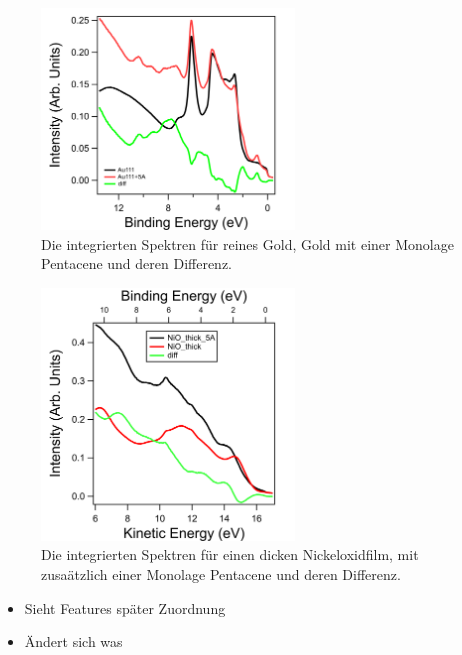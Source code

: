         \begin{figure}
            \centering
            \includegraphics[width=0.6\textwidth]{./content/EDC_Au_5A.png}
            \caption{Die integrierten Spektren für reines Gold, Gold mit einer Monolage Pentacene und deren Differenz.}
            \label{fig:Au+5A}
        \end{figure}

        \begin{figure}
            \centering
            \includegraphics[width=0.6\textwidth]{./content/NiO_thick_5A.png}
            \caption{Die integrierten Spektren für einen dicken Nickeloxidfilm, mit zusaätzlich einer Monolage Pentacene und deren Differenz.}
            \label{fig:NiO+5A}
        \end{figure}

        \begin{itemize}
            \item Sieht Features später Zuordnung
            \item Ändert sich was
        \end{itemize}

